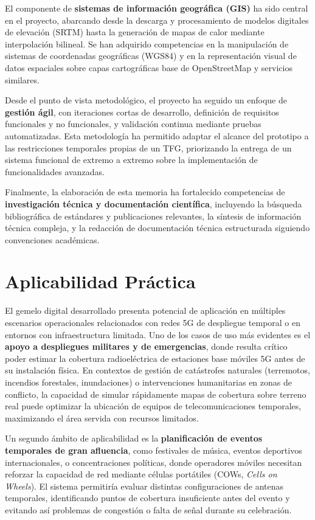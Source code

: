 El componente de \textbf{sistemas de información geográfica (GIS)} ha sido central en el proyecto, abarcando desde la descarga y procesamiento de modelos digitales de elevación (SRTM) hasta la generación de mapas de calor mediante interpolación bilineal. Se han adquirido competencias en la manipulación de sistemas de coordenadas geográficas (WGS84) y en la representación visual de datos espaciales sobre capas cartográficas base de OpenStreetMap y servicios similares.

Desde el punto de vista metodológico, el proyecto ha seguido un enfoque de \textbf{gestión ágil}, con iteraciones cortas de desarrollo, definición de requisitos funcionales y no funcionales, y validación continua mediante pruebas automatizadas. Esta metodología ha permitido adaptar el alcance del prototipo a las restricciones temporales propias de un TFG, priorizando la entrega de un sistema funcional de extremo a extremo sobre la implementación de funcionalidades avanzadas.

Finalmente, la elaboración de esta memoria ha fortalecido competencias de \textbf{investigación técnica y documentación científica}, incluyendo la búsqueda bibliográfica de estándares y publicaciones relevantes, la síntesis de información técnica compleja, y la redacción de documentación técnica estructurada siguiendo convenciones académicas.

\section{Aplicabilidad Práctica}
\label{sec:aplicabilidad}

El gemelo digital desarrollado presenta potencial de aplicación en múltiples escenarios operacionales relacionados con redes 5G de despliegue temporal o en entornos con infraestructura limitada. Uno de los casos de uso más evidentes es el \textbf{apoyo a despliegues militares y de emergencias}, donde resulta crítico poder estimar la cobertura radioeléctrica de estaciones base móviles 5G antes de su instalación física. En contextos de gestión de catástrofes naturales (terremotos, incendios forestales, inundaciones) o intervenciones humanitarias en zonas de conflicto, la capacidad de simular rápidamente mapas de cobertura sobre terreno real puede optimizar la ubicación de equipos de telecomunicaciones temporales, maximizando el área servida con recursos limitados.

Un segundo ámbito de aplicabilidad es la \textbf{planificación de eventos temporales de gran afluencia}, como festivales de música, eventos deportivos internacionales, o concentraciones políticas, donde operadores móviles necesitan reforzar la capacidad de red mediante células portátiles (COWs, \textit{Cells on Wheels}). El sistema permitiría evaluar distintas configuraciones de antenas temporales, identificando puntos de cobertura insuficiente antes del evento y evitando así problemas de congestión o falta de señal durante su celebración.

